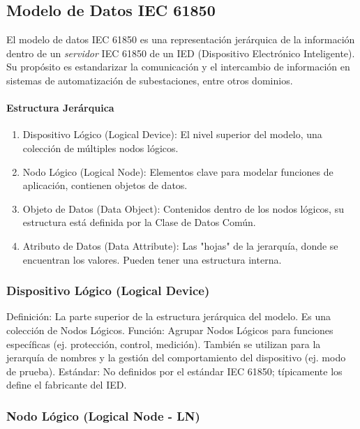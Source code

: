 \documentclass[a5paper]{book}%
\begin{document}
\subsection{Modelo de Datos IEC 61850}

El modelo de datos IEC 61850 es una representación jerárquica de la información dentro de un \textit{servidor} IEC 61850 de un IED (Dispositivo Electrónico Inteligente). Su propósito es estandarizar la comunicación y el intercambio de información en sistemas de automatización de subestaciones, entre otros dominios.

\paragraph{Estructura Jerárquica}

\begin{enumerate}
\item     Dispositivo Lógico (Logical Device): El nivel superior del modelo, una colección de múltiples nodos lógicos.
    
\item Nodo Lógico (Logical Node): Elementos clave para modelar funciones de aplicación, contienen objetos de datos.
    
\item Objeto de Datos (Data Object): Contenidos dentro de los nodos lógicos, su estructura está definida por la Clase de Datos Común.
    
\item Atributo de Datos (Data Attribute): Las "hojas" de la jerarquía, donde se encuentran los valores. Pueden tener una estructura interna.
  \end{enumerate}

\subsubsection{ Dispositivo Lógico (Logical Device)}

    Definición: La parte superior de la estructura jerárquica del modelo. Es una colección de Nodos Lógicos.
    Función: Agrupar Nodos Lógicos para funciones específicas (ej. protección, control, medición). También se utilizan para la jerarquía de nombres y la gestión del comportamiento del dispositivo (ej. modo de prueba).
    Estándar: No definidos por el estándar IEC 61850; típicamente los define el fabricante del IED.

\subsubsection{Nodo Lógico (Logical Node - LN)}
\end{document}
